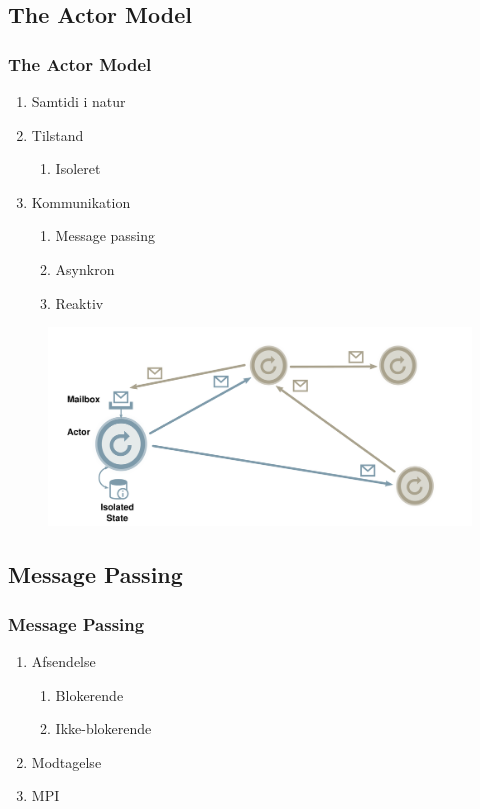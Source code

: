 \subsection{The Actor Model}
\begin{frame}
  \frametitle{The Actor Model}
  \begin{enumerate}
    \item Samtidi i natur
    \item Tilstand
    \begin{enumerate}
      \item Isoleret
    \end{enumerate}
    \item Kommunikation
    \begin{enumerate}
      \item Message passing
      \item Asynkron
      \item Reaktiv
    \end{enumerate}
  \end{enumerate}
  \begin{figure}[htbp]
  \centering
  \includegraphics[width=\textwidth]{Images/actors.pdf}
\end{figure}
\end{frame}

\subsection{Message Passing}
\begin{frame}
  \frametitle{Message Passing}
  \begin{enumerate}
    \item Afsendelse
    \begin{enumerate}
      \item Blokerende
      \item Ikke-blokerende
    \end{enumerate}
    \item Modtagelse
    \item MPI
  \end{enumerate}
\end{frame}

